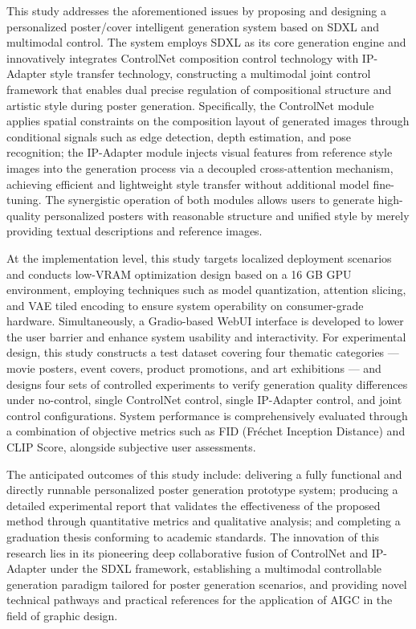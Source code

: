 \documentclass[12pt,a4paper]{ctexart}
\begin{document}
This study addresses the aforementioned issues by proposing and designing a personalized poster/cover intelligent generation system based on SDXL and multimodal control. The system employs SDXL as its core generation engine and innovatively integrates ControlNet composition control technology with IP-Adapter style transfer technology, constructing a multimodal joint control framework that enables dual precise regulation of compositional structure and artistic style during poster generation. Specifically, the ControlNet module applies spatial constraints on the composition layout of generated images through conditional signals such as edge detection, depth estimation, and pose recognition; the IP-Adapter module injects visual features from reference style images into the generation process via a decoupled cross-attention mechanism, achieving efficient and lightweight style transfer without additional model fine-tuning. The synergistic operation of both modules allows users to generate high-quality personalized posters with reasonable structure and unified style by merely providing textual descriptions and reference images.

At the implementation level, this study targets localized deployment scenarios and conducts low-VRAM optimization design based on a 16 GB GPU environment, employing techniques such as model quantization, attention slicing, and VAE tiled encoding to ensure system operability on consumer-grade hardware. Simultaneously, a Gradio-based WebUI interface is developed to lower the user barrier and enhance system usability and interactivity. For experimental design, this study constructs a test dataset covering four thematic categories — movie posters, event covers, product promotions, and art exhibitions — and designs four sets of controlled experiments to verify generation quality differences under no-control, single ControlNet control, single IP-Adapter control, and joint control configurations. System performance is comprehensively evaluated through a combination of objective metrics such as FID (Fréchet Inception Distance) and CLIP Score, alongside subjective user assessments.

The anticipated outcomes of this study include: delivering a fully functional and directly runnable personalized poster generation prototype system; producing a detailed experimental report that validates the effectiveness of the proposed method through quantitative metrics and qualitative analysis; and completing a graduation thesis conforming to academic standards. The innovation of this research lies in its pioneering deep collaborative fusion of ControlNet and IP-Adapter under the SDXL framework, establishing a multimodal controllable generation paradigm tailored for poster generation scenarios, and providing novel technical pathways and practical references for the application of AIGC in the field of graphic design.
\end{document}
